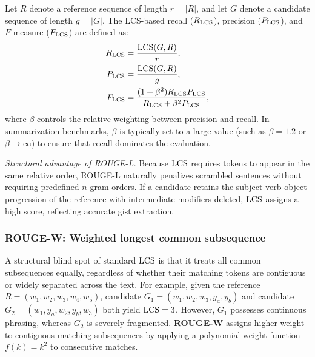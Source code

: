 \documentclass[../../../main.tex]{subfiles}
\begin{document}
Let $R$ denote a reference sequence of length $r = |R|$, and let $G$ denote a candidate sequence of length $g = |G|$. The LCS-based recall ($R_{\operatorname{LCS}}$), precision ($P_{\operatorname{LCS}}$), and $F$-measure ($F_{\operatorname{LCS}}$) are defined as:
\begin{align}
\label{eq:rouge_l_recall}
R_{\operatorname{LCS}} &= \frac{\operatorname{LCS}(G, R)}{r}, \\
\label{eq:rouge_l_precision}
P_{\operatorname{LCS}} &= \frac{\operatorname{LCS}(G, R)}{g}, \\
\label{eq:rouge_l_fmeasure}
F_{\operatorname{LCS}} &= \frac{(1 + \beta^2) R_{\operatorname{LCS}} P_{\operatorname{LCS}}}{R_{\operatorname{LCS}} + \beta^2 P_{\operatorname{LCS}}},
\end{align}
where $\beta$ controls the relative weighting between precision and recall. In summarization benchmarks, $\beta$ is typically set to a large value (such as $\beta = 1.2$ or $\beta \to \infty$) to ensure that recall dominates the evaluation.

\textit{Structural advantage of ROUGE-L.} Because $\operatorname{LCS}$ requires tokens to appear in the same relative order, ROUGE-L naturally penalizes scrambled sentences without requiring predefined $n$-gram orders. If a candidate retains the subject-verb-object progression of the reference with intermediate modifiers deleted, $\operatorname{LCS}$ assigns a high score, reflecting accurate gist extraction.

\subsubsection{ROUGE-W: Weighted longest common subsequence}
A structural blind spot of standard $\operatorname{LCS}$ is that it treats all common subsequences equally, regardless of whether their matching tokens are contiguous or widely separated across the text. For example, given the reference $R = (w_1, w_2, w_3, w_4, w_5)$, candidate $G_1 = (w_1, w_2, w_3, y_a, y_b)$ and candidate $G_2 = (w_1, y_a, w_2, y_b, w_3)$ both yield $\operatorname{LCS} = 3$. However, $G_1$ possesses continuous phrasing, whereas $G_2$ is severely fragmented. \textbf{ROUGE-W} assigns higher weight to contiguous matching subsequences by applying a polynomial weight function $f(k) = k^2$ to consecutive matches.
\end{document}
